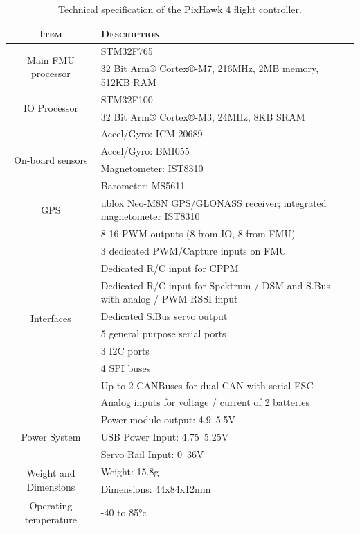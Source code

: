 \begin{table}
    \centering
    \begin{tabular}{cp{27em}}
        \toprule \textsc{Item} & \textsc{Description}\\
        \midrule
        \multirow{2}{*}{Main FMU processor} & STM32F765 \\
        & 32 Bit Arm® Cortex®-M7, 216MHz, 2MB memory, 512KB RAM \\
        \midrule
        \multirow{2}{*}{IO Processor} & STM32F100 \\
        & 32 Bit Arm® Cortex®-M3, 24MHz, 8KB SRAM \\
        \midrule
        \multirow{4}{*}{On-board sensors} & Accel/Gyro: ICM-20689 \\
        & Accel/Gyro: BMI055 \\
        & Magnetometer: IST8310 \\
        & Barometer: MS5611 \\
        \midrule
        GPS & ublox Neo-M8N GPS/GLONASS receiver; integrated magnetometer IST8310 \\
        \midrule
        \multirow{10}{*}{Interfaces} & 8-16 PWM outputs (8 from IO, 8 from FMU) \\
        & 3 dedicated PWM/Capture inputs on FMU \\
        & Dedicated R/C input for CPPM \\
        & Dedicated R/C input for Spektrum / DSM and S.Bus with analog / PWM RSSI input \\
        & Dedicated S.Bus servo output \\
        & 5 general purpose serial ports \\
        & 3 I2C ports \\
        & 4 SPI buses \\
        & Up to 2 CANBuses for dual CAN with serial ESC \\
        & Analog inputs for voltage / current of 2 batteries \\
        \midrule
        \multirow{3}{*}{Power System} & Power module output: 4.9~5.5V \\
        & USB Power Input: 4.75~5.25V \\
        & Servo Rail Input: 0~36V \\
        \midrule
        \multirow{2}{*}{Weight and Dimensions} & Weight: 15.8g \\
        & Dimensions: 44x84x12mm \\
        \midrule
        Operating temperature & -40 to 85°c \\
        \bottomrule
    \end{tabular}
    \caption[PixHawk 4 Specification]{Technical specification of the PixHawk 4 flight controller.}
    \label{tab:chapter2:drone:px4fc}
\end{table}

